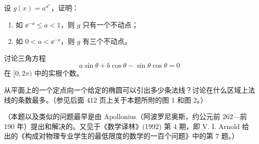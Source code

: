 \begin{xreferenceproblem}[18]
设 $g(x)=a^{a^x}$，证明：
  \begin{enumerate}[label=(\arabic*)]
    \item 如 $\ee^{-\ee}\le a<1$，则 $g$ 只有一个不动点；
    \item 如 $0<a<\ee^{-\ee}$，则 $g$ 有三个不动点。
  \end{enumerate}
\end{xreferenceproblem}

\begin{xreferenceproblem}[19]
讨论三角方程
  \[
    a\sin\theta+b\cos\theta-\sin\theta\cos\theta=0
  \]
  在 $[0,2\pi)$ 中的实根个数。
\end{xreferenceproblem}

\begin{xreferenceproblem}[20]
从平面上的一个定点向一个给定的椭圆可以引出多少条法线？讨论在什么区域上法线的条数最多。（参见后面 412 页上关于本题所附的图 1 和图 2。）

  （本题以及类似的问题最早是由 Apollonius（阿波罗尼奥斯，约公元前 262—前 190 年）提出和解决的。又见于《数学译林》(1992) 第 4 期，即 V. I. Arnold 给出的《构成对物理专业学生的最低限度的数学的一百个问题》中的第 7 题。）
\end{xreferenceproblem}
